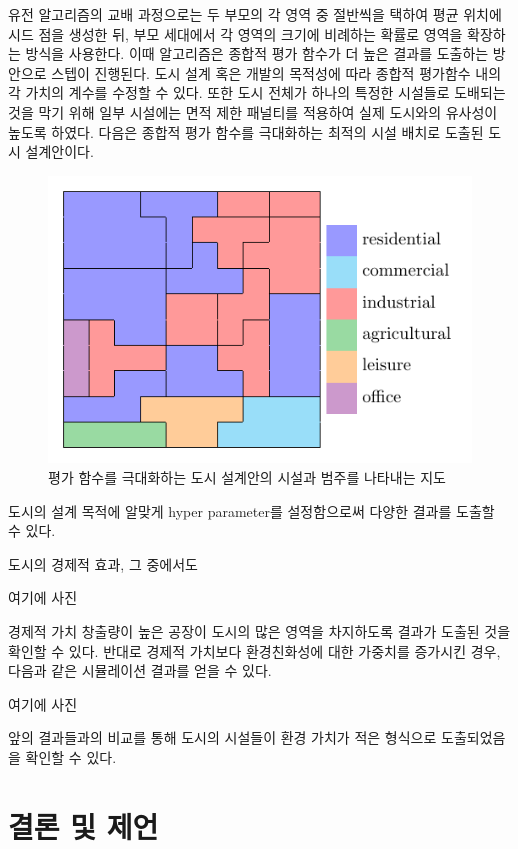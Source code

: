 \documentclass[10pt]{article}
\begin{document}
\begin{multicols}{2}
유전 알고리즘의 교배 과정으로는 두 부모의 각 영역 중 절반씩을 택하여 평균 위치에 시드 점을 생성한 뒤, 부모 세대에서 각 영역의 크기에 비례하는 확률로 영역을 확장하는 방식을 사용한다. 이때 알고리즘은 종합적 평가 함수가 더 높은 결과를 도출하는 방안으로 스텝이 진행된다. 도시 설계 혹은 개발의 목적성에 따라 종합적 평가함수 내의 각 가치의 계수를 수정할 수 있다. 또한 도시 전체가 하나의 특정한 시설들로 도배되는 것을 막기 위해 일부 시설에는 면적 제한 패널티를 적용하여 실제 도시와의 유사성이 높도록 하였다. 다음은 종합적 평가 함수를 극대화하는 최적의 시설 배치로 도출된 도시 설계안이다.
\begin{figure}[H]
 \centering
 \includegraphics[width=1\linewidth]{images/genetic_algorithm_result_table.pdf}
 \caption{평가 함수를 극대화하는 도시 설계안의 시설과 범주를 나타내는 지도}
 \label{fig:enter-label}
\end{figure}

도시의 설계 목적에 알맞게 hyper parameter를 설정함으로써 다양한 결과를 도출할 수 있다.

도시의 경제적 효과, 그 중에서도 

여기에 사진

경제적 가치 창출량이 높은 공장이 도시의 많은 영역을 차지하도록 결과가 도출된 것을 확인할 수 있다. 반대로 경제적 가치보다 환경친화성에 대한 가중치를 증가시킨 경우, 다음과 같은 시뮬레이션 결과를 얻을 수 있다.

여기에 사진

앞의 결과들과의 비교를 통해 도시의 시설들이 환경 가치가 적은 형식으로 도출되었음을 확인할 수 있다.

\section{결론 및 제언}

\end{multicols}
\end{document}
